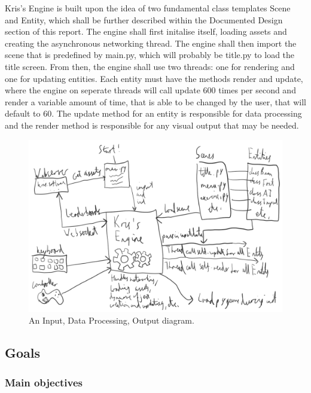 \documentclass{article}
\begin{document}
Kris's Engine is built upon the idea of two fundamental class templates Scene and Entity, which shall be further described within the Documented Design section of this report. The engine shall first initalise itself, loading assets and creating the asynchronous networking thread. The engine shall then import the scene that is predefined by main.py, which will probably be title.py to load the title screen. From then, the engine shall use two threads: one for rendering and one for updating entities. Each entity must have the methods render and update, where the engine on seperate threads will call update 600 times per second and render a variable amount of time, that is able to be changed by the user, that will default to 60. The update method for an entity is responsible for data processing and the render method is responsible for any visual output that may be needed.

\begin{figure}[h]
\centering
\includegraphics[width=1\textwidth]{idpo.png}
\caption{\label{fig:idpo}An Input, Data Processing, Output diagram.}
\end{figure}

\subsection{Goals}

\subsubsection{Main objectives}
\end{document}
